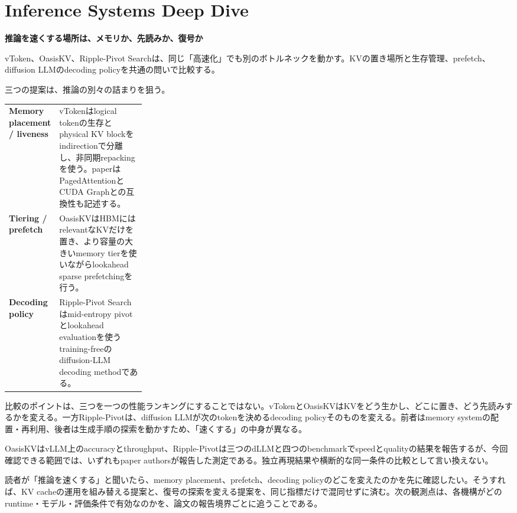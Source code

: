 \section{Inference Systems Deep Dive}
\begin{wideflow}
{\Large\bfseries 推論を速くする場所は、メモリか、先読みか、復号か}\par
\smallskip
{\color{SurveyMuted}vToken、OasisKV、Ripple-Pivot Searchは、同じ「高速化」でも別のボトルネックを動かす。KVの置き場所と生存管理、prefetch、diffusion LLMのdecoding policyを共通の問いで比較する。}\par
\end{wideflow}

三つの提案は、推論の別々の詰まりを狙う。

\begin{themeoverview}[機構を同じ表に置く]
\begin{tabularx}{\linewidth}{@{}>{\bfseries}p{0.27\linewidth}X@{}}
Memory placement / liveness & vTokenはlogical tokenの生存とphysical KV blockをindirectionで分離し、非同期repackingを使う。paperはPagedAttentionとCUDA Graphとの互換性も記述する\cite{vtoken}。\\
Tiering / prefetch & OasisKVはHBMにはrelevantなKVだけを置き、より容量の大きいmemory tierを使いながらlookahead sparse prefetchingを行う\cite{oasiskv}。\\
Decoding policy & Ripple-Pivot Searchはmid-entropy pivotとlookahead evaluationを使うtraining-freeのdiffusion-LLM decoding methodである\cite{ripplepivot}。
\end{tabularx}
\end{themeoverview}

比較のポイントは、三つを一つの性能ランキングにすることではない。vTokenとOasisKVはKVをどう生かし、どこに置き、どう先読みするかを変える。一方Ripple-Pivotは、diffusion LLMが次のtokenを決めるdecoding policyそのものを変える。前者はmemory systemの配置・再利用、後者は生成手順の探索を動かすため、「速くする」の中身が異なる。

\begin{claimboundary}[評価値の帰属]
OasisKVはvLLM上のaccuracyとthroughput、Ripple-Pivotは三つのdLLMと四つのbenchmarkでspeedとqualityの結果を報告するが、今回確認できる範囲では、いずれもpaper authorsが報告した測定である。独立再現結果や横断的な同一条件の比較として言い換えない。
\end{claimboundary}

読者が「推論を速くする」と聞いたら、memory placement、prefetch、decoding policyのどこを変えたのかを先に確認したい。そうすれば、KV cacheの運用を組み替える提案と、復号の探索を変える提案を、同じ指標だけで混同せずに済む。次の観測点は、各機構がどのruntime・モデル・評価条件で有効なのかを、論文の報告境界ごとに追うことである。

